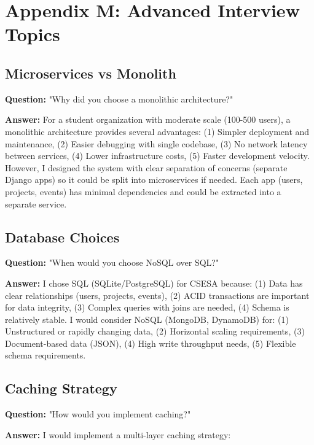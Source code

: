 \documentclass[11pt,a4paper]{article}
\begin{document}
\section{Appendix M: Advanced Interview Topics}

\subsection{Microservices vs Monolith}
\textbf{Question:} "Why did you choose a monolithic architecture?"

\textbf{Answer:} For a student organization with moderate scale (100-500 users), a monolithic architecture provides several advantages: (1) Simpler deployment and maintenance, (2) Easier debugging with single codebase, (3) No network latency between services, (4) Lower infrastructure costs, (5) Faster development velocity. However, I designed the system with clear separation of concerns (separate Django apps) so it could be split into microservices if needed. Each app (users, projects, events) has minimal dependencies and could be extracted into a separate service.

\subsection{Database Choices}
\textbf{Question:} "When would you choose NoSQL over SQL?"

\textbf{Answer:} I chose SQL (SQLite/PostgreSQL) for CSESA because: (1) Data has clear relationships (users, projects, events), (2) ACID transactions are important for data integrity, (3) Complex queries with joins are needed, (4) Schema is relatively stable. I would consider NoSQL (MongoDB, DynamoDB) for: (1) Unstructured or rapidly changing data, (2) Horizontal scaling requirements, (3) Document-based data (JSON), (4) High write throughput needs, (5) Flexible schema requirements.

\subsection{Caching Strategy}
\textbf{Question:} "How would you implement caching?"

\textbf{Answer:} I would implement a multi-layer caching strategy:
\end{document}

